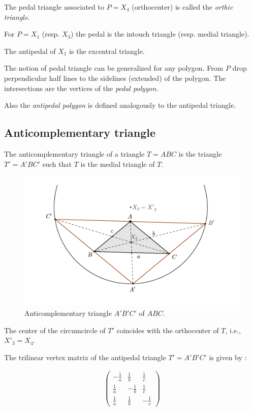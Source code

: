  The pedal triangle associated to  $P=X_4$ (orthocenter) is called the {\em orthic triangle}.
 
 For $P=X_1$ (resp. $X_3$) the pedal is the intouch triangle (resp. medial triangle). 
 
 The antipedal of $X_1$ is the excentral triangle.

The notion of pedal triangle  can be generalized for any polygon. From $P$ drop perpendicular half lines to the sidelines (extended) of the polygon. The intersections are the vertices of the {\em pedal polygon.}

Also the {\em  antipedal polygon} is defined analogously to the antipedal triangle.
 
 \subsection{ Anticomplementary triangle}
 
 The anticomplementary triangle of a triangle $T=ABC$ is the triangle $T'=A'BC'$ such that $T$ is the medial triangle of $T$.
 
  \begin{figure}[H]
     \centering
      \includegraphics[scale=0.6]{zappA/pics/pics_appA_0100_anticimplementary.pdf}
    \caption{Anticomplementary triangle $A'B'C'$ of $ABC$.}
    \label{fig:pedal-triangle}
\end{figure}
The center of the circumcircle of $T'$ coincides with the orthocenter of $T$, i.e., $X'_3=X_4$.

The trilinear vertex matrix of the antipedal triangle $T'=A'B'C'$ is given by \cite{mw}:
 
\begin{align*}
   \left(\begin{matrix}-\frac{1}{a} &\frac{1}{b} &\frac{1}{c}\\
    \frac{1}{a} &-\frac{1}{b} &\frac{1}{c}\\
    \frac{1}{a} &\frac{1}{b} &-\frac{1}{c}\end{matrix}\right)
    \end{align*}
   
